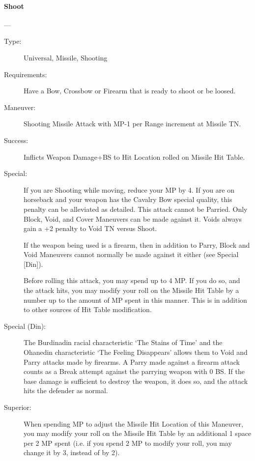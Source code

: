 \documentclass[oneside,11pt,english]{book}
\begin{document}
\paragraph{\large\label{man:Shoot}Shoot}---\quad{\large[???????]}
\vspace{-10pt}\begin{description} 
\item [Type:] Universal, Missile, Shooting 
\item [Requirements:] Have a Bow, Crossbow or Firearm that is ready to shoot or be loosed. 
\item [Maneuver:] Shooting Missile Attack with MP-1 per Range increment at Missile TN. 
\item [Success:] Inflicts Weapon Damage+BS to Hit Location rolled on Missile Hit Table. 
\item [Special:] If you are Shooting while moving, reduce your MP by 4. If you are on horseback and your 
weapon has the Cavalry Bow special quality, this penalty can be alleviated as detailed. 
This attack cannot be Parried. Only Block, Void, and Cover Maneuvers can be made against it. 
Voids always gain a +2 penalty to Void TN versus Shoot.

If the weapon being used is a firearm, then in addition to Parry, Block and Void Maneuvers cannot 
normally be made against it either (see Special [Din]). 

Before rolling this attack, you may spend up to 4 MP. If you do so, and the attack hits, you may modify 
your roll on the Missile Hit Table by a number up to the amount of MP spent in this manner. This is in 
addition to other sources of Hit Table modification. 
\item [Special (Din):] The Burdinadin racial characteristic ‘The Stains of Time’ and the Ohanedin characteristic 
‘The Feeling Disappears’ allows them to Void and Parry attacks made by firearms. A Parry made against 
a firearm attack counts as a Break attempt against the parrying weapon with 0 BS. If the base damage is 
sufficient to destroy the weapon, it does so, and the attack hits the defender as normal. 
\item [Superior:] When spending MP to adjust the Missile Hit Location of this Maneuver, you may modify your 
roll on the Missile Hit Table by an additional 1 space per 2 MP spent (i.e. if you spend 2 MP to modify 
your roll, you may change it by 3, instead of by 2). 
\end{description}
\end{document}
